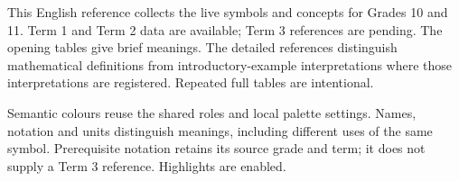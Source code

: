 \maketitle
This English reference collects the live symbols and concepts for Grades 10
and 11. Term 1 and Term 2 data are available; Term 3 references are pending.
The opening tables give brief meanings. The detailed references distinguish
mathematical definitions from introductory-example interpretations where those
interpretations are registered. Repeated full tables are intentional.

Semantic colours reuse the shared roles and local palette settings. Names,
notation and units distinguish meanings, including different uses of the same
symbol. Prerequisite notation retains its source grade and term; it does not
supply a Term 3 reference. Highlights are enabled.
\tableofcontents\label{preview:contents}

\PreviewBackToContents
{}
\PreviewBackToContents
{}
\PreviewBackToContents

\PreviewBackToContents
\clearpage %
\PreviewBackToContents
\clearpage %
\PreviewBackToContents
{}
\PreviewPending

\PreviewBackToContents
\clearpage %
\PreviewBackToContents
\clearpage %
\PreviewBackToContents
{}
\PreviewPending

